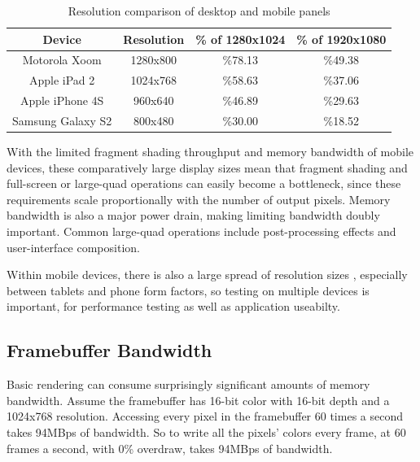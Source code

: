 \begin{table}[htb]\centering \begin{tabular}{|c||c|c|c|} 
\hline \small{Device} & \small{Resolution} & \small{\% of 1280x1024 } & \small{\% of 1920x1080 }  \\ \hline 
\hline \small{Motorola Xoom} & \small{1280x800} & \small{\%78.13} & \small{\%49.38}\\ 
\hline \small{Apple iPad 2} & \small{1024x768} & \small{\%58.63} & \small{\%37.06}\\ 
\hline \small{Apple iPhone 4S} & \small{960x640} & \small{\%46.89} & \small{\%29.63}\\
\hline \small{Samsung Galaxy S2} & \small{800x480} & \small{\%30.00} & \small{\%18.52}\\ \hline
\end{tabular} 
\caption{Resolution comparison of desktop and mobile panels} 
\label{JonMcCaffrey:resolutions} \end{table}


With the limited fragment shading throughput and memory bandwidth of mobile
devices, these comparatively large display sizes mean that fragment shading and
full-screen or large-quad operations can easily become a bottleneck, since
these requirements scale proportionally with the number of output pixels.
Memory bandwidth is also a major power drain, making limiting bandwidth doubly
important.  Common large-quad operations include post-processing effects and user-interface composition.

Within mobile devices, there is also a large spread of resolution sizes
, especially between tablets and phone form factors, so testing
on multiple devices is important, for performance testing as well as
application useabilty.

\subsection{Framebuffer Bandwidth}\label{Jon-McCaffrey-Framebuffer-Bandwidth}

Basic rendering can consume surprisingly significant amounts of memory
bandwidth.  Assume the framebuffer has 16-bit color with 16-bit depth
\cite{Google11} and a 1024x768 resolution.  Accessing every pixel in the
framebuffer 60 times a second takes 94MBps of bandwidth.  So to write all the
pixels' colors every frame, at 60 frames a second, with 0\%
overdraw, takes 94MBps of bandwidth.

